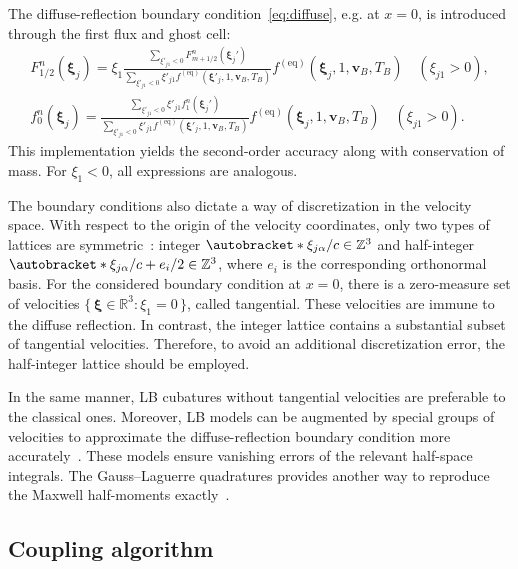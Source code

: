 \documentclass[]{elsarticle} %
\newcommand{\Set}[2]{\{\,{#1}:{#2}\,\}}
\DeclarePairedDelimiter\autobracket()       %
\newcommand{\br}[1]{\autobracket*{#1}}
\newcommand{\bxi}{\boldsymbol{\xi}}
\newcommand{\bv}{\boldsymbol{v}}
\newcommand{\bxia}{\bxi_j}
\newcommand{\xiai}{\xi_{j \alpha}}
\newcommand{\equil}[1]{#1^\mathrm{(eq)}}
\begin{document}
{%
The diffuse-reflection boundary condition~\eqref{eq:diffuse}, e.g. at \(x=0\),
is introduced through the first flux and ghost cell:
\begin{gather}
    F_{1/2}^n(\bxia) = \displaystyle\xi_1\frac{\sum_{\xi'_{j1}<0}F_{m+1/2}^n(\bxia')}
        {\sum_{\xi'_{j1}<0}\xi'_{j1}\equil{f}(\bxi'_j,1,\bv_B,T_B)}
        \equil{f}(\bxi_j, 1, \bv_B, T_B) \quad (\xi_{j1}>0), \label{eq:first_flux}\\
    f_0^n(\bxia) = \displaystyle\frac{\sum_{\xi'_{j1}<0}\xi'_{j1}f_1^n(\bxia')}
        {\sum_{\xi'_{j1}<0}\xi'_{j1}\equil{f}(\bxi'_j,1,\bv_B,T_B)}
        \equil{f}(\bxi_j, 1, \bv_B, T_B) \quad (\xi_{j1}>0). \label{eq:first_ghost}
\end{gather}
This implementation yields the second-order accuracy along with conservation of mass.
For \(\xi_1<0\), all expressions are analogous.

The boundary conditions also dictate a way of discretization in the velocity space.
With respect to the origin of the velocity coordinates, only two types of lattices are symmetric~\cite{Inamuro1990}:
integer \(\br{\xiai/c} \in \mathbb{Z}^3\) and half-integer \(\br{\xiai/c + e_i/2} \in \mathbb{Z}^3\),
where \(e_i\) is the corresponding orthonormal basis.
For the considered boundary condition at \(x=0\), there is a zero-measure set of velocities
\(\Set{\bxi\in\mathbb{R}^3}{\xi_1=0}\), called tangential.
These velocities are immune to the diffuse reflection.
In contrast, the integer lattice contains a substantial subset of tangential velocities.
Therefore, to avoid an additional discretization error, the half-integer lattice should be employed.

In the same manner, LB cubatures without tangential velocities are preferable to the classical ones.
Moreover, LB models can be augmented by special groups of velocities to approximate
the diffuse-reflection boundary condition more accurately~\cite{Feuchter2016}.
These models ensure vanishing errors of the relevant half-space integrals.
The Gauss--Laguerre quadratures provides another way to reproduce the Maxwell half-moments exactly~\cite{Ambrus2014, Ambrus2016}.

\subsection{Coupling algorithm}\label{sec:numerics:coupling}


}
\end{document}
